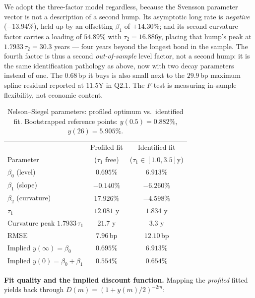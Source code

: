 \documentclass[11pt]{article}
\begin{document}
We adopt the three-factor model regardless, because the Svensson parameter vector is not a
description of a second hump. Its asymptotic long rate is \emph{negative} ($-13.94\%$), held up by
an offsetting $\beta_1$ of $+14.30\%$; and its second curvature factor carries a loading of
$54.89\%$ with $\tau_2=16.886$y, placing that hump's peak at $1.7933\,\tau_2=30.3$ years --- four
years beyond the longest bond in the sample. The fourth factor is thus a second \emph{out-of-sample}
level factor, not a second hump: it is the same identification pathology as above, now with two
decay parameters instead of one. The $0.68$\,bp it buys is also small next to the
$29.9$\,bp maximum spline residual reported at $11.5$Y in Q2.1. The
$F$-test is measuring in-sample flexibility, not economic content.
 
\begin{table}[htbp]
  \centering
  \begin{tabular}{lcc}
    \toprule
     & Profiled fit & Identified fit \\
    Parameter & ($\tau_1$ free) & ($\tau_1\in[1.0,3.5]$y) \\
    \midrule
    $\beta_0$ (level)      & $0.695\%$      & $6.913\%$ \\
    $\beta_1$ (slope)      & $-0.140\%$     & $-6.260\%$ \\
    $\beta_2$ (curvature)  & $17.926\%$     & $-4.598\%$ \\
    $\tau_1$               & $12.081$ y     & $1.834$ y \\
    Curvature peak $1.7933\,\tau_1$ & $21.7$ y & $3.3$ y \\
    RMSE                   & $7.96$\,bp     & $12.10$\,bp \\
    \midrule
    Implied $y(\infty)=\beta_0$ & $0.695\%$ & $6.913\%$ \\
    Implied $y(0)=\beta_0+\beta_1$ & $0.554\%$ & $0.654\%$ \\
    \bottomrule
  \end{tabular}
  \caption{Nelson--Siegel parameters: profiled optimum vs.\ identified fit. Bootstrapped reference
           points: $y(0.5)=0.882\%$, $y(26)=5.905\%$.}
  \label{tab:ns-params}
\end{table}
 
\textbf{Fit quality and the implied discount function.} Mapping the \emph{profiled} fitted yields
back through $D(m)=(1+y(m)/2)^{-2m}$:
 
\end{document}
